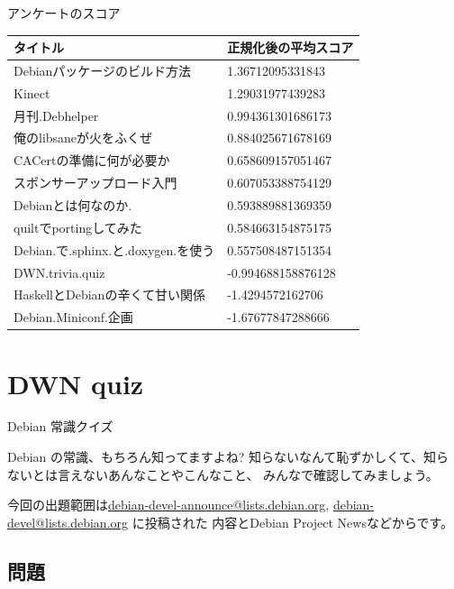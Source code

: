 \begin{frame}{アンケートのスコア}

 \begin{center}
 {\small
 \begin{tabular}{|p{15em}|l|}
 \hline
 タイトル & 正規化後の平均スコア \\
 \hline
 Debianパッケージのビルド方法&1.36712095331843\\
 Kinect&1.29031977439283\\
 月刊.Debhelper&0.994361301686173\\
 俺のlibsaneが火をふくぜ&0.884025671678169\\
 CACertの準備に何が必要か&0.658609157051467\\
 スポンサーアップロード入門&0.607053388754129\\
 Debianとは何なのか.&0.593889881369359\\
 quiltでportingしてみた&0.584663154875175\\
 Debian.で.sphinx.と.doxygen.を使う&0.557508487151354\\
 DWN.trivia.quiz&-0.994688158876128\\
 HaskellとDebianの辛くて甘い関係&-1.4294572162706\\
 Debian.Miniconf.企画&-1.67677847288666\\
 \hline
 \end{tabular}
 }
 \end{center}
\end{frame}

\section{DWN quiz}
\begin{frame}{Debian 常識クイズ}

Debian の常識、もちろん知ってますよね?
知らないなんて恥ずかしくて、知らないとは言えないあんなことやこんなこと、
みんなで確認してみましょう。

今回の出題範囲は\url{debian-devel-announce@lists.debian.org},
\url{debian-devel@lists.debian.org} に投稿された
内容とDebian Project Newsなどからです。

\end{frame}

\subsection{問題}



